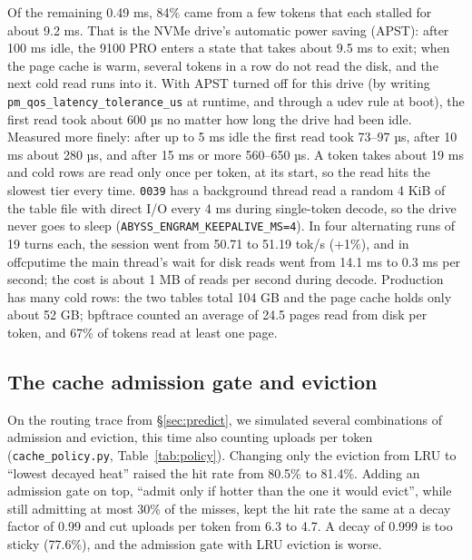 \documentclass[11pt,a4paper]{article}
\newcommand{\code}[1]{\texttt{#1}}
\newcommand{\tps}{tok/s}
\begin{document}
Of the remaining 0.49 ms, 84\% came from a few tokens that each stalled for about 9.2 ms. That is the NVMe drive's automatic power saving (APST): after 100 ms idle, the 9100 PRO enters a state that takes about 9.5 ms to exit; when the page cache is warm, several tokens in a row do not read the disk, and the next cold read runs into it. With APST turned off for this drive (by writing \code{pm\_qos\_latency\_tolerance\_us} at runtime, and through a udev rule at boot), the first read took about 600 µs no matter how long the drive had been idle. Measured more finely: after up to 5 ms idle the first read took 73--97 µs, after 10 ms about 280 µs, and after 15 ms or more 560--650 µs. A token takes about 19 ms and cold rows are read only once per token, at its start, so the read hits the slowest tier every time. \code{0039} has a background thread read a random 4 KiB of the table file with direct I/O every 4 ms during single-token decode, so the drive never goes to sleep (\code{ABYSS\_ENGRAM\_KEEPALIVE\_MS=4}). In four alternating runs of 19 turns each, the session went from 50.71 to 51.19 \tps{} (+1\%), and in offcputime the main thread's wait for disk reads went from 14.1 ms to 0.3 ms per second; the cost is about 1 MB of reads per second during decode. Production has many cold rows: the two tables total 104 GB and the page cache holds only about 52 GB; bpftrace counted an average of 24.5 pages read from disk per token, and 67\% of tokens read at least one page.

\subsection{The cache admission gate and eviction}
\label{sec:gate}

On the routing trace from \S\ref{sec:predict}, we simulated several combinations of admission and eviction, this time also counting uploads per token (\code{cache\_policy.py}, Table~\ref{tab:policy}). Changing only the eviction from LRU to ``lowest decayed heat'' raised the hit rate from 80.5\% to 81.4\%. Adding an admission gate on top, ``admit only if hotter than the one it would evict'', while still admitting at most 30\% of the misses, kept the hit rate the same at a decay factor of 0.99 and cut uploads per token from 6.3 to 4.7. A decay of 0.999 is too sticky (77.6\%), and the admission gate with LRU eviction is worse.
\end{document}

